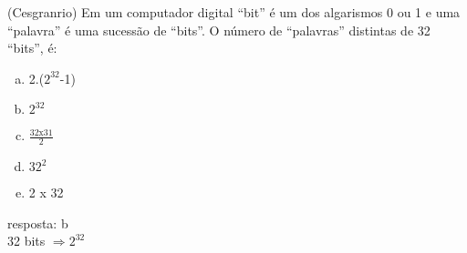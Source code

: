 \begin{ex}
 (Cesgranrio) Em um computador digital “bit” é um dos algarismos 0 ou 1 e uma “palavra” é uma sucessão de “bits”. O número de “palavras” distintas de 32 “bits”, é:
    \begin{enumerate}[(a)]
    \item 2.($2^{32}$-1)
    \item $2^{32}$
    \item $\frac { 32 \text{x} 31  }{2}$
    \item ${32}^2$
    \item 2 x 32
    \end{enumerate}
      \begin{sol}
        resposta: b \\
        32 bits $\Longrightarrow 2^{32}$
      \end{sol}
\end{ex}